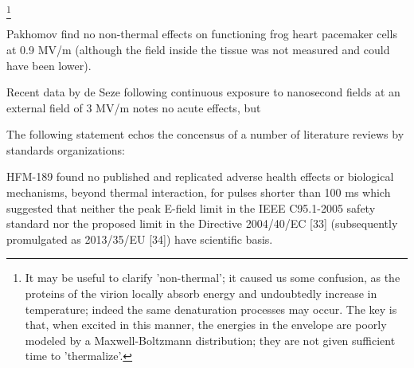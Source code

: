 \documentclass[paper.tex]{subfiles}
\begin{document}
\begin{multicols}{1}
%
\footnote{It may be useful to clarify 'non-thermal'; it caused us some confusion, as the proteins of the virion locally absorb energy and undoubtedly increase in temperature; indeed the same denaturation processes may occur. The key is that, when excited in this manner, the energies in the envelope are poorly modeled by a Maxwell-Boltzmann distribution; they are not given sufficient time to 'thermalize'.} 
%




%
%
%
%
%
%
%
%
%
%
%



Pakhomov \cite{Comparative} find no non-thermal effects on functioning frog heart pacemaker cells at 0.9 MV/m (although the field inside the tissue was not measured and could have been lower). 

Recent data by de Seze following continuous exposure to nanosecond fields at an external field of 3 MV/m \cite{Repeated2020} notes no acute effects, but 

The following statement echos the concensus of a number of literature reviews by standards organizations:

\begin{fquote}
	HFM-189 found no published and replicated adverse health effects or biological mechanisms, beyond
	thermal interaction, for pulses shorter than 100 ms which suggested that neither the peak E-field limit in the
	IEEE C95.1-2005 safety standard {} nor the proposed limit in the Directive 2004/40/EC [33] (subsequently promulgated as 2013/35/EU [34]) have scientific basis. 
	

\end{fquote}
\end{multicols}
\end{document}
